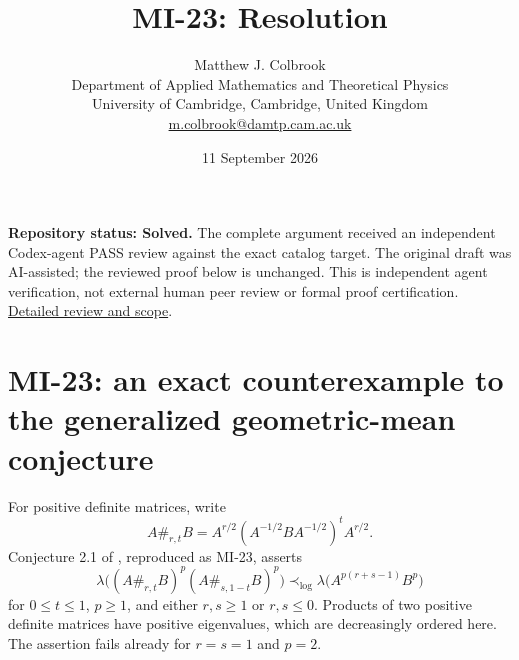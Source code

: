 \documentclass[10pt,a4paper]{article}
\title{MI-23: Resolution}
\author{Matthew J. Colbrook\\
\small Department of Applied Mathematics and Theoretical Physics\\
\small University of Cambridge, Cambridge, United Kingdom\\
\small\href{mailto:m.colbrook@damtp.cam.ac.uk}{m.colbrook@damtp.cam.ac.uk}}
\date{11 September 2026}
\theoremstyle{remark}
\begin{document}
\maketitle
\textbf{Repository status: Solved.}
The complete argument received an independent Codex-agent PASS review
against the exact catalog target.
The original draft was AI-assisted; the reviewed proof below is unchanged.
This is independent agent verification, not external human peer review or
formal proof certification. \href{https://github.com/ajt60gaibb/OpenProblemsInNLA/blob/main/references/colbrook-matrix-2026-09-11/verification/reviews/MI-23-review.md}{Detailed review and scope}.
\par\medskip
\section{MI-23: an exact counterexample to the generalized geometric-mean conjecture}
\label{sec:mi23}
For positive definite matrices, write
\[
 A\#_{r,t}B=A^{r/2}(A^{-1/2}BA^{-1/2})^tA^{r/2}.
\]
Conjecture 2.1 of \cite{GAMA2021}, reproduced as MI-23, asserts
\begin{equation}\label{eq:mi23-target}
 \lambda\bigl((A\#_{r,t}B)^p(A\#_{s,1-t}B)^p\bigr)
 \prec_{\log}\lambda\bigl(A^{p(r+s-1)}B^p\bigr)
\end{equation}
for $0\leq t\leq1$, $p\geq1$, and either $r,s\geq1$ or $r,s\leq0$. Products of two positive definite matrices have positive eigenvalues, which are decreasingly ordered here. The assertion fails already for $r=s=1$ and $p=2$.
\end{document}
